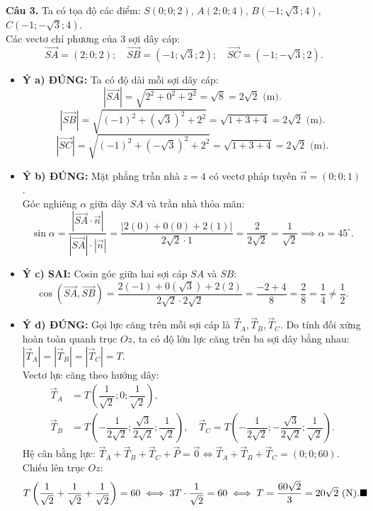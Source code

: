 \documentclass[12pt,a4paper]{article}
\begin{document}
\vspace{0.2cm}\noindent\textbf{Câu 3.}
Ta có tọa độ các điểm: $S(0; 0; 2)$, $A(2; 0; 4)$, $B(-1; \sqrt{3}; 4)$, $C(-1; -\sqrt{3}; 4)$.\\
Các vectơ chỉ phương của 3 sợi dây cáp:
$$\vec{SA} = (2; 0; 2); \quad \vec{SB} = (-1; \sqrt{3}; 2); \quad \vec{SC} = (-1; -\sqrt{3}; 2).$$
\begin{itemize}[leftmargin=*]
    \item \textbf{Ý a) ĐÚNG:} Ta có độ dài mỗi sợi dây cáp:
    $$|\vec{SA}| = \sqrt{2^2 + 0^2 + 2^2} = \sqrt{8} = 2\sqrt{2}\text{ (m)}.$$
    $$|\vec{SB}| = \sqrt{(-1)^2 + (\sqrt{3})^2 + 2^2} = \sqrt{1 + 3 + 4} = 2\sqrt{2}\text{ (m)}.$$
    $$|\vec{SC}| = \sqrt{(-1)^2 + (-\sqrt{3})^2 + 2^2} = \sqrt{1 + 3 + 4} = 2\sqrt{2}\text{ (m)}.$$
    \item \textbf{Ý b) ĐÚNG:} Mặt phẳng trần nhà $z = 4$ có vectơ pháp tuyến $\vec{n} = (0; 0; 1)$.\\
    Góc nghiêng $\alpha$ giữa dây $SA$ và trần nhà thỏa mãn:
    $$\sin \alpha = \dfrac{|\vec{SA} \cdot \vec{n}|}{|\vec{SA}| \cdot |\vec{n}|} = \dfrac{|2(0) + 0(0) + 2(1)|}{2\sqrt{2} \cdot 1} = \dfrac{2}{2\sqrt{2}} = \dfrac{1}{\sqrt{2}} \implies \alpha = 45^\circ.$$
    \item \textbf{Ý c) SAI:} Cosin góc giữa hai sợi cáp $SA$ và $SB$:
    $$\cos(\vec{SA}, \vec{SB}) = \dfrac{2(-1) + 0(\sqrt{3}) + 2(2)}{2\sqrt{2} \cdot 2\sqrt{2}} = \dfrac{-2 + 4}{8} = \dfrac{2}{8} = \dfrac{1}{4} \ne \dfrac{1}{2}.$$
    \item \textbf{Ý d) ĐÚNG:} Gọi lực căng trên mỗi sợi cáp là $\vec{T}_A, \vec{T}_B, \vec{T}_C$. Do tính đối xứng hoàn toàn quanh trục $Oz$, ta có độ lớn lực căng trên ba sợi dây bằng nhau: $|\vec{T}_A| = |\vec{T}_B| = |\vec{T}_C| = T$.\\
    Vectơ lực căng theo hướng dây:
    \begin{align*}
        \vec{T}_A &= T \left(\dfrac{1}{\sqrt{2}}; 0; \dfrac{1}{\sqrt{2}}\right), \\
        \vec{T}_B &= T \left(-\dfrac{1}{2\sqrt{2}}; \dfrac{\sqrt{3}}{2\sqrt{2}}; \dfrac{1}{\sqrt{2}}\right), \quad
        \vec{T}_C = T \left(-\dfrac{1}{2\sqrt{2}}; -\dfrac{\sqrt{3}}{2\sqrt{2}}; \dfrac{1}{\sqrt{2}}\right).
    \end{align*}
    Hệ cân bằng lực: $\vec{T}_A + \vec{T}_B + \vec{T}_C + \vec{P} = \vec{0} \iff \vec{T}_A + \vec{T}_B + \vec{T}_C = (0; 0; 60)$.\\
    Chiếu lên trục $Oz$:
    $$T \left(\dfrac{1}{\sqrt{2}} + \dfrac{1}{\sqrt{2}} + \dfrac{1}{\sqrt{2}}\right) = 60 \iff 3T \cdot \dfrac{1}{\sqrt{2}} = 60 \iff T = \dfrac{60\sqrt{2}}{3} = 20\sqrt{2}\text{ (N)}.\hfill\blacksquare$$
\end{itemize}
\end{document}
